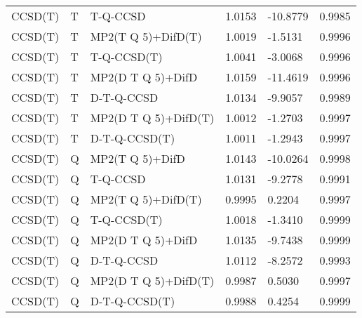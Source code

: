 \begin{table}
\begin{tabular}{l l l l l l }
    CCSD(T) & T & T-Q-CCSD & 1.0153 & -10.8779 & 0.9985 \\ 
    CCSD(T) & T & MP2(T Q 5)+DifD(T) & 1.0019 & -1.5131 & 0.9996 \\ 
    CCSD(T) & T & T-Q-CCSD(T) & 1.0041 & -3.0068 & 0.9996 \\ 
    CCSD(T) & T & MP2(D T Q 5)+DifD & 1.0159 & -11.4619 & 0.9996 \\ 
    CCSD(T) & T & D-T-Q-CCSD & 1.0134 & -9.9057 & 0.9989 \\ 
    CCSD(T) & T & MP2(D T Q 5)+DifD(T) & 1.0012 & -1.2703 & 0.9997 \\ 
    CCSD(T) & T & D-T-Q-CCSD(T) & 1.0011 & -1.2943 & 0.9997 \\ 
    CCSD(T) & Q & MP2(T Q 5)+DifD & 1.0143 & -10.0264 & 0.9998 \\ 
    CCSD(T) & Q & T-Q-CCSD & 1.0131 & -9.2778 & 0.9991 \\ 
    CCSD(T) & Q & MP2(T Q 5)+DifD(T) & 0.9995 & 0.2204 & 0.9997 \\ 
    CCSD(T) & Q & T-Q-CCSD(T) & 1.0018 & -1.3410 & 0.9999 \\ 
    CCSD(T) & Q & MP2(D T Q 5)+DifD & 1.0135 & -9.7438 & 0.9999 \\ 
    CCSD(T) & Q & D-T-Q-CCSD & 1.0112 & -8.2572 & 0.9993 \\ 
    CCSD(T) & Q & MP2(D T Q 5)+DifD(T) & 0.9987 & 0.5030 & 0.9997 \\ 
    CCSD(T) & Q & D-T-Q-CCSD(T) & 0.9988 & 0.4254 & 0.9999 \\ 
    \hline
  \end{tabular}
\end{table}
